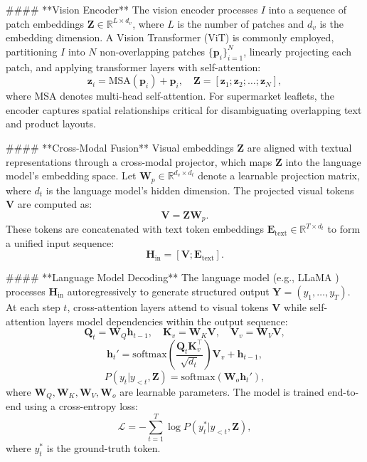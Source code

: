 \documentclass[11pt]{article}
\begin{document}
#### **Vision Encoder**  
The vision encoder processes \( I \) into a sequence of patch embeddings \( \mathbf{Z} \in \mathbb{R}^{L \times d_v} \), where \( L \) is the number of patches and \( d_v \) is the embedding dimension. A Vision Transformer (ViT) \cite{dosovitskiy2020vit} is commonly employed, partitioning \( I \) into \( N \) non-overlapping patches \( \{\mathbf{p}_i\}_{i=1}^N \), linearly projecting each patch, and applying transformer layers with self-attention:  
\[
\mathbf{z}_i = \text{MSA}(\mathbf{p}_i) + \mathbf{p}_i, \quad \mathbf{Z} = [\mathbf{z}_1; \mathbf{z}_2; \dots; \mathbf{z}_N],
\]  
where MSA denotes multi-head self-attention. For supermarket leaflets, the encoder captures spatial relationships critical for disambiguating overlapping text and product layouts.

#### **Cross-Modal Fusion**  
Visual embeddings \( \mathbf{Z} \) are aligned with textual representations through a cross-modal projector, which maps \( \mathbf{Z} \) into the language model's embedding space. Let \( \mathbf{W}_p \in \mathbb{R}^{d_v \times d_t} \) denote a learnable projection matrix, where \( d_t \) is the language model's hidden dimension. The projected visual tokens \( \mathbf{V} \) are computed as:  
\[
\mathbf{V} = \mathbf{Z} \mathbf{W}_p.
\]  
These tokens are concatenated with text token embeddings \( \mathbf{E}_{\text{text}} \in \mathbb{R}^{T \times d_t} \) to form a unified input sequence:  
\[
\mathbf{H}_{\text{in}} = [\mathbf{V}; \mathbf{E}_{\text{text}}].
\]

#### **Language Model Decoding**  
The language model (e.g., LLaMA \cite{touvron2023llama}) processes \( \mathbf{H}_{\text{in}} \) autoregressively to generate structured output \( \mathbf{Y} = (y_1, \dots, y_T) \). At each step \( t \), cross-attention layers attend to visual tokens \( \mathbf{V} \) while self-attention layers model dependencies within the output sequence:  
\[
\mathbf{Q}_t = \mathbf{W}_Q \mathbf{h}_{t-1}, \quad \mathbf{K}_v = \mathbf{W}_K \mathbf{V}, \quad \mathbf{V}_v = \mathbf{W}_V \mathbf{V},
\]  
\[
\mathbf{h}_t' = \text{softmax}\left(\frac{\mathbf{Q}_t \mathbf{K}_v^\top}{\sqrt{d_t}}\right) \mathbf{V}_v + \mathbf{h}_{t-1},
\]  
\[
P(y_t | y_{<t}, \mathbf{Z}) = \text{softmax}(\mathbf{W}_o \mathbf{h}_t'),
\]  
where \( \mathbf{W}_Q, \mathbf{W}_K, \mathbf{W}_V, \mathbf{W}_o \) are learnable parameters. The model is trained end-to-end using a cross-entropy loss:  
\[
\mathcal{L} = -\sum_{t=1}^T \log P(y_t^* | y_{<t}, \mathbf{Z}),
\]  
where \( y_t^* \) is the ground-truth token.
\end{document}
